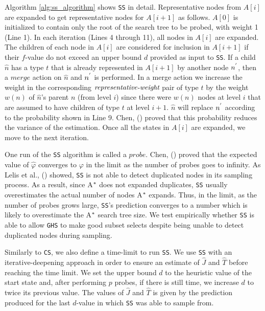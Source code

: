 Algorithm \ref{alg:ss_algorithm} shows \texttt{SS} in detail. Representative nodes from $A[i]$ are expanded to get representative nodes for $A[i+1]$ as follows. $A[0]$ is initialized to contain only the root of the search tree to be probed, with weight 1 (Line 1). In each iteration (Lines 4 through 11), all nodes in $A[i]$ are expanded. The children of each node in $A[i]$ are considered for inclusion in $A[i+1]$ if their $f$-value do not exceed an upper bound $d$ provided as input to \texttt{SS}. If a child $\hat{n}$ has a type $t$ that is already represented in $A[i+1]$ by another node $n\sp{'}$, then a $merge$ action on $\hat{n}$ and $n\sp{'}$ is performed. In a merge action we increase the weight in the corresponding $\emph{representative-weight}$ pair of type $t$ by the weight $w(n)$ of $\hat{n}$'s parent $n$ (from level $i$) since there were $w(n)$ nodes at level $i$ that are assumed to have children of type $t$ at level $i+1$. $\hat{n}$ will replace $n\sp{'}$ according to the probability shown in Line 9. Chen, (\citeyear{chen1992heuristic}) proved that this probability reduces the variance of the estimation. Once all the states in $A[i]$ are expanded, we move to the next iteration.

One run of the \texttt{SS} algorithm is called a $probe$. Chen,  (\citeyear{chen1992heuristic}) proved that the expected value of $\hat{\varphi}$ converges to $\varphi$ in the limit as the number of probes goes to infinity. As Lelis et al., (\citeyear{lelis2014estimating}) showed, \texttt{SS} is not able to detect duplicated nodes in its sampling process. As a result, since A$\sp{*}$ does not expanded duplicates, \texttt{SS} usually overestimates the actual number of nodes A$\sp{*}$ expands. Thus, in the limit, as the number of probes grows large, \texttt{SS}'s prediction converges to a number which  is likely to overestimate the A$\sp{*}$ search tree size. We test empirically whether \texttt{SS} is able to allow \texttt{GHS} to make good subset selects despite being unable to detect duplicated nodes during sampling.

Similarly to \texttt{CS}, we also define a time-limit to run \texttt{SS}. We use \texttt{SS} with an iterative-deepening approach in order to ensure an estimate of $\hat{J}$ and $\hat{T}$ before reaching the time limit. We set the upper bound $d$ to the heuristic value of the start state and, after performing $p$ probes, if there is still time, we increase $d$ to twice its previous value. The values of $\hat{J}$ and $\hat{T}$ is given by the prediction produced for the last $d$-value in which \texttt{SS} was able to sample from.

